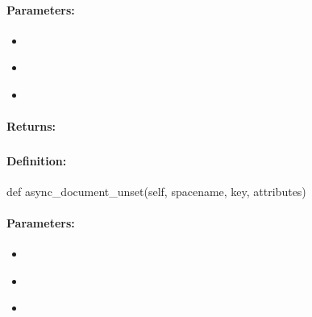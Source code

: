 \paragraph{Parameters:}
\begin{itemize}[noitemsep]
\item {}\\

\item {}\\

\item {}\\

\end{itemize}

\paragraph{Returns:}


\pagebreak
\subsubsection{}
\label{api:python:async_document_unset}


\paragraph{Definition:}
\begin{pythoncode}
def async_document_unset(self, spacename, key, attributes)
\end{pythoncode}

\paragraph{Parameters:}
\begin{itemize}[noitemsep]
\item {}\\

\item {}\\

\item {}\\

\end{itemize}

